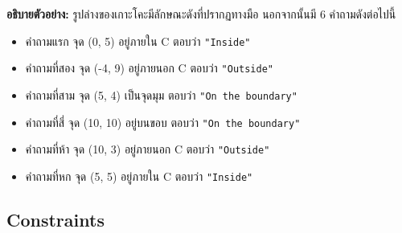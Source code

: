 \medskip\noindent
\textbf{อธิบายตัวอย่าง:} รูปล่างของเกาะโคะมีลักษณะดังที่ปรากฏทางมือ\;
นอกจากนั้นมี 6 คำถามดังต่อไปนี้
\begin{itemize}[itemsep=0pt]
\item คำถามแรก จุด (0, 5) อยู่ภายใน C ตอบว่า \lstinline|"Inside"|
\item คำถามที่สอง จุด (-4, 9) อยู่ภายนอก C ตอบว่า \lstinline|"Outside"|
\item คำถามที่สาม จุด (5, 4) เป็นจุดมุม ตอบว่า \lstinline|"On the boundary"|
\item คำถามที่สี่ จุด (10, 10) อยู่บนขอบ ตอบว่า \lstinline|"On the boundary"|
\item คำถามที่ห้า จุด (10, 3) อยู่ภายนอก C ตอบว่า \lstinline|"Outside"|
\item คำถามที่หก จุด (5, 5) อยู่ภายใน C ตอบว่า \lstinline|"Inside"|
\end{itemize}

\subsection*{\sectionfont\upshape Constraints}

